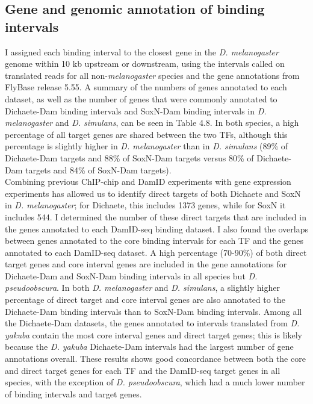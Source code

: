 \subsection{Gene and genomic annotation of binding intervals}
I assigned each binding interval to the closest gene in the \emph{D. melanogaster} genome within 10 kb upstream or downstream, using the intervals called on translated reads for all non-\emph{melanogaster} species and the gene annotations from FlyBase release 5.55. A summary of the numbers of genes annotated to each dataset, as well as the number of genes that were commonly annotated to Dichaete-Dam binding intervals and SoxN-Dam binding intervals in \emph{D. melanogaster} and \emph{D. simulans}, can be seen in Table 4.8. In both species, a high percentage of all target genes are shared between the two TFs, although this percentage is slightly higher in \emph{D. melanogaster} than in \emph{D. simulans} (89\% of Dichaete-Dam targets and 88\% of SoxN-Dam targets versus 80\% of Dichaete-Dam targets and 84\% of SoxN-Dam targets).\\

Combining previous ChIP-chip and DamID experiments with gene expression experiments has allowed us to identify direct targets of both Dichaete and SoxN in \emph{D. melanogaster}; for Dichaete, this includes 1373 genes, while for SoxN it includes 544. I determined the number of these direct targets that are included in the genes annotated to each DamID-seq binding dataset. I also found the overlaps between genes annotated to the core binding intervals for each TF and the genes annotated to each DamID-seq dataset. A high percentage (70-90\%) of both direct target genes and core interval genes are included in the gene annotations for Dichaete-Dam and SoxN-Dam binding intervals in all species but \emph{D. pseudoobscura}. In both \emph{D. melanogaster} and \emph{D. simulans}, a slightly higher percentage of direct target and core interval genes are also annotated to the Dichaete-Dam binding intervals than to SoxN-Dam binding intervals. Among all the Dichaete-Dam datasets, the genes annotated to intervals translated from \emph{D. yakuba} contain the most core interval genes and direct target genes; this is likely because the \emph{D. yakuba} Dichaete-Dam intervals had the largest number of gene annotations overall. These results shows good concordance between both the core and direct target genes for each TF and the DamID-seq target genes in all species, with the exception of \emph{D. pseudoobscura}, which had a much lower number of binding intervals and target genes.\\

